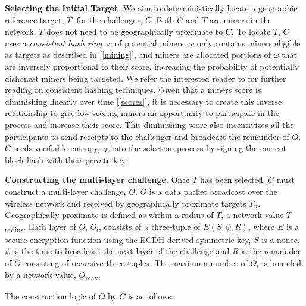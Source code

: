 \documentclass[UTF8, 10pt, nonatbib, nocopyrightspace, reprint]{sigplanconf}
\newcommand{\secref}[1]{[\autoref{#1}]}
\begin{document}
\textbf{Selecting the Initial Target}. We aim to deterministically locate a geographic reference target, $T$, for the challenger, $C$. Both $C$ and $T$ are miners in the network. $T$ does not need to be geographically proximate to $C$. To locate $T$, $C$ uses a \emph{consistent hash ring} $\omega$, of potential miners. $\omega$ only contains miners eligible as targets as described in \secref{mining}, and miners are allocated portions of $\omega$ that are inversely proportional to their score, increasing the probability of potentially dishonest miners being targeted. We refer the interested reader to \cite{hashing} for further reading on consistent hashing techniques. Given that a miners score is diminishing linearly over time \secref{scores}, it is necessary to create this inverse relationship to give low-scoring miners an opportunity to participate in the process and increase their score. This diminishing score also incentivizes all the participants to send receipts to the challenger and broadcast the remainder of $O$. $C$ seeds verifiable entropy, $\eta$, into the selection process by signing the current block hash with their private key.

\textbf{Constructing the multi-layer challenge}. Once $T$ has been selected, $C$ must construct a multi-layer challenge, $O$. $O$ is a data packet broadcast over the wireless network and received by geographically proximate targets $T_n$. Geographically proximate is defined as within a radius of $T$, a network value $T$\textsubscript{radius}. Each layer of $O$, $O_l$, consists of a three-tuple of $E\left(S, \psi, R\right)$, where $E$ is a secure encryption function using the ECDH derived symmetric key, $S$ is a nonce, $\psi$ is the time to broadcast the next layer of the challenge and $R$ is the remainder of $O$ consisting of recursive three-tuples. The maximum number of $O_l$ is bounded by a network value, $O$\textsubscript{max}.

The construction logic of $O$ by $C$ is as follows:
\end{document}
